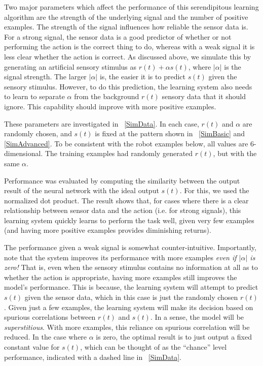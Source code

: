 \documentclass{frontiersSCNS}
\begin{document}
Two major parameters which affect the performance of this serendipitous learning
algorithm are the strength of the underlying signal and the number of positive
examples.  The strength of the signal influences how reliable the sensor
data is.  For a strong signal, the sensor data is a good predictor of whether
or not performing the action is the correct thing to do, whereas with a weak
signal it is less clear whether the action is correct.  As discussed above,
we simulate this by generating an artificial sensory stimulus as $r(t) + \alpha s(t)$,
where $|\alpha|$ is the signal strength.  The larger $|\alpha|$ is, the easier it
is to predict $s(t)$ given the sensory stimulus.  However, to do this prediction,
the learning system also needs to learn to separate $\alpha$ from the background
$r(t)$ sensory data that it should ignore.  This capability should improve
with more positive examples.

These parameters are investigated in \figurename~\ref{SimData}.  In each
case, $r(t)$ and $\alpha$ are randomly chosen, and $s(t)$ is fixed at the
pattern shown in \figurename~\ref{SimBasic} and \ref{SimAdvanced}.  To be
consistent with the robot examples below, all values are 6-dimensional.  The
training examples had randomly generated $r(t)$, but with the same $\alpha$.

Performance was evaluated by computing the similarity between the output result
of the neural network with the ideal output $s(t)$.  For this, we used the
normalized dot product.  The result shows that, for cases where there is a
clear relationship between sensor data and the action (i.e. for strong signals),
this learning system quickly learns to perform the task well, given very few examples
(and having more positive examples provides diminishing returns).

The performance given a weak signal is somewhat counter-intuitive.  Importantly,
note that the system improves its performance with more examples \textit{even
if $|\alpha|$ is zero!}  That is, even when the sensory stimulus contains
no information at all as to whether the action is appropriate, having more
examples still improves the model's performance.  This is because, the learning
system will attempt to predict $s(t)$ given the sensor data, which in this case
is just the randomly chosen $r(t)$.  Given just a few examples, the learning
system will make its decision based on spurious correlations between $r(t)$
and $s(t)$.  In a sense, the model will be \textit{superstitious}.  With more
examples, this reliance on spurious correlation will be reduced.  In the case
where $\alpha$ is zero, the optimal result is to just output a fixed constant
value for $s(t)$, which can be thought of as the ``chance'' level performance,
indicated with a dashed line in \figurename~\ref{SimData}.
\end{document}
